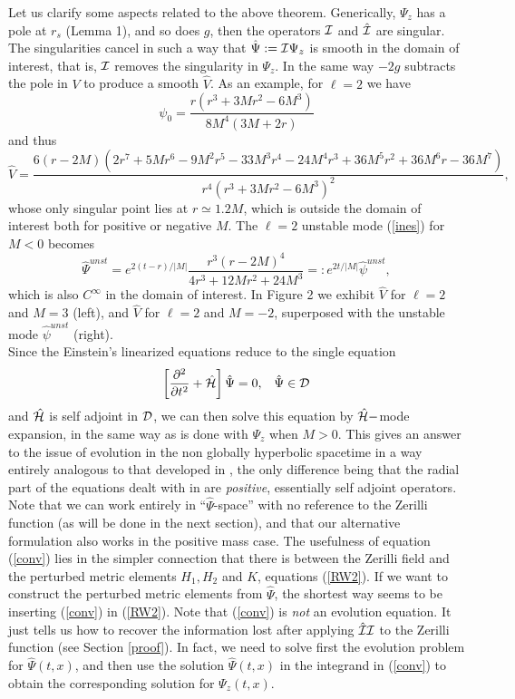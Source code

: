 \documentclass[aps,floats,showpacs,amssymb,tightenlines]{revtex4}
\def\p{\partial}
\def\I{{\cal I}}
\begin{document}
Let us clarify some aspects related to the above theorem. Generically,
$\Psi_z$ has a pole at $r_s$ (Lemma 1), and so does $g$, then the operators $\I$ and $\hat \I$
are singular. The singularities cancel in such a way  that $\hat \Psi := \I \Psi_z$ is smooth in the
domain of interest, that is,
$\I$ removes the singularity in $\Psi_z$. In the same way $-2g$ subtracts the pole in $V$
to produce a smooth $\hat V$. As an example, for $\ell=2$ we have \cite{ghi}
\begin{equation} \label{l2zm}
\psi_0 = \frac{r(r^3+3Mr^2-6M^3)}{8M^4(3M+2r)}
\end{equation}
and thus
\begin{equation}
\hat V = \frac{6 (r-2M)(2r^7+5Mr^6-9M^2r^5-33M^3r^4-24M^4r^3+36M^5r^2+36M^6 r-36M^7)}{r^4 (r^3+3Mr^2-6M^3)^2},
\end{equation}
whose only singular point  lies at $r \simeq 1.2 M$, which is outside the domain of interest both for
positive or negative $M$. The $\ell=2$ 
 unstable mode (\ref{ines}) for $M<0$ becomes
\begin{equation}
\label{hpsiunst}
\hat \Psi ^{unst}  = e^{2(t-r)/|M|} \frac{r^ 3 \left( r-2M \right)^4}{4r^3+12M r^2+24M^3} =: e^{2t/|M|} \hat \psi^{unst},
\end{equation}
which is also $C^{\infty}$ in the domain of interest. In Figure 2  we exhibit $\hat V$ for $\ell=2$
and $M=3$ (left), and $\hat V$ for $\ell=2$ and $M=-2$,   superposed with the unstable mode $\hat \psi^{unst}$ (right).\\
 Since the Einstein's linearized equations  reduce to the single equation
 \begin{equation} \label{nee}
\left[ \frac{\p^2 }{\p t^2} + \hat {\cal H} \right] \hat \Psi =0, \;\;\; \hat \Psi \in  {\cal D}
\end{equation}
and
 $\hat {\cal H}$ is self adjoint in ${\cal D}$, we can then solve this equation
by $\hat {\cal H}-$mode expansion, in the same way as is done with $\Psi_z$ when $M>0$. 
This gives an answer to the issue of evolution in  the non globally hyperbolic spacetime 
in a way entirely analogous to that developed in \cite{wi}, the only difference being that 
the radial part of the equations dealt with in \cite{wi} are {\em positive}, essentially self
adjoint operators. 
Note that we can work entirely in ``$\hat \Psi$-space'' with no reference to
the Zerilli function (as will be done in the next section), and that our alternative formulation also works in the positive mass case.
The  usefulness of equation (\ref{conv}) lies in the simpler connection that there is between the Zerilli field and the
perturbed metric elements $H_1,H_2$ and $K$, equations (\ref{RW2}). If we want to construct the perturbed metric elements from
$\hat \Psi$, the shortest way seems to be inserting (\ref{conv}) in (\ref{RW2}). Note that (\ref{conv}) is {\em not}
 an evolution equation. It just tells us how to recover the information lost  after applying $\hat \I \I$ to
 the Zerilli function (see
 Section \ref{proof}).  In fact, we need to solve first the evolution problem for $\hat \Psi(t,x)$, and then use 
the solution $\hat \Psi(t,x)$  in the integrand in (\ref{conv}) to obtain the corresponding solution for $\Psi_z(t,x)$.\\
\end{document}
